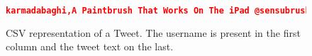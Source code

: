 \begin{figure}
  \begin{center}
    \begin{lstlisting}[language=json,firstnumber=1]
    karmadabaghi,A Paintbrush That Works On The iPad @sensubrushman
    \end{lstlisting}
  \end{center}
  \caption{\ac{CSV} representation of a Tweet. The username is present in the first column and the tweet text on the last.}
  \label{fig:csv_tweet}
\end{figure}

